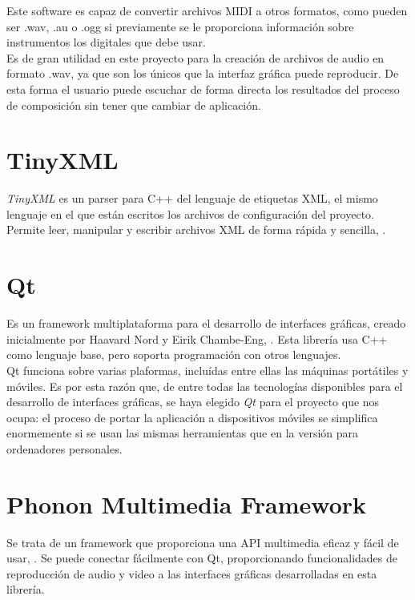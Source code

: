 Este software es capaz de convertir archivos MIDI a otros formatos, como pueden ser .wav, .au o .ogg si previamente se le proporciona información sobre instrumentos los digitales que debe usar.\\

Es de gran utilidad en este proyecto para la creación de archivos de audio en formato .wav, ya que son los únicos que la interfaz gráfica puede reproducir. De esta forma el usuario puede escuchar de forma directa los resultados del proceso de composición sin tener que cambiar de aplicación.

\section{TinyXML}
\label{sec:TinyXML}

\emph{TinyXML} es un parser para C++ del lenguaje de etiquetas XML, el mismo lenguaje en el que están escritos los archivos de configuración del proyecto. Permite leer, manipular y escribir archivos XML de forma rápida y sencilla, \cite{tinyxml}.\\

\section{Qt}
\label{sec:Qt}

Es un framework multiplataforma para el desarrollo de interfaces gráficas, creado inicialmente por Haavard Nord y Eirik Chambe-Eng, \cite{qtlibs}. Esta librería usa C++ como lenguaje base, pero soporta programación con otros lenguajes.\\

Qt funciona sobre varias plaformas, incluídas entre ellas las máquinas portátiles y móviles. Es por esta razón que, de entre todas las tecnologías disponibles para el desarrollo de interfaces gráficas, se haya elegido \emph{Qt} para el proyecto que nos ocupa: el proceso de portar la aplicación a dispositivos móviles se simplifica enormemente si se usan las mismas herramientas que en la versión para ordenadores personales.

\section{Phonon Multimedia Framework}
\label{sec:Phonon}

Se trata de un framework que proporciona una API multimedia eficaz y fácil de usar, \cite{phononOverview}. Se puede conectar fácilmente con Qt, proporcionando funcionalidades de reproducción de audio y video a las interfaces gráficas desarrolladas en esta librería.\\

